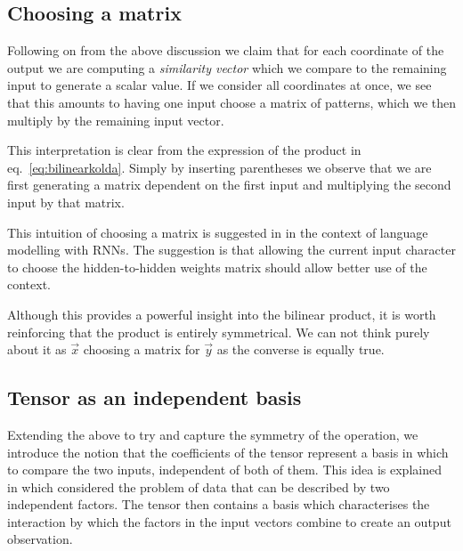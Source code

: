 \subsection{Choosing a matrix}
Following on from the above discussion we claim that for each coordinate of the output we are
computing a \emph{similarity vector} which we compare to the remaining input to generate a
scalar value. If we consider all coordinates at once, we see that this amounts to having
one input choose a matrix of patterns, which we then multiply by the remaining input vector. 

This interpretation is clear from the expression of the product in
eq.~\eqref{eq:bilinearkolda}. Simply by inserting parentheses we observe that we are
first generating a matrix dependent on the first input and multiplying
the second input by that matrix.

This intuition of choosing a matrix is suggested in \autocite{Sutskever2013} in the
context of language modelling with RNNs. The suggestion is that allowing the current input
character to choose the hidden-to-hidden weights matrix should allow better use of the context. 

Although this provides a powerful insight into the bilinear product, it is worth reinforcing that
the product is entirely symmetrical. We can not think purely about it as \(\vec{x}\) choosing a matrix
for \(\vec{y}\) as the converse is equally true.

\subsection{Tensor as an independent basis}
Extending the above to try and capture the symmetry of the operation, we introduce
the notion that the coefficients of the tensor represent a basis in which to compare the
two inputs, independent of both of them. This idea is explained in
 \autocite{Tenenbaum2000} which considered the problem of data that can be described by two
independent factors.
The tensor then contains a basis which characterises the interaction by which the factors
in the input vectors combine to create an output observation.

